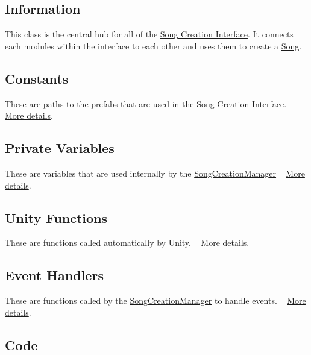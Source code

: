 \hypertarget{group___doc_s_c_m_DocSCMInfo}{}\subsection{Information}\label{group___doc_s_c_m_DocSCMInfo}
This class is the central hub for all of the \hyperlink{group___doc_s_c}{Song Creation Interface}. It connects each modules within the interface to each other and uses them to create a \hyperlink{class_song}{Song}.\hypertarget{group___doc_s_c_m_DocSCMConst}{}\subsection{Constants}\label{group___doc_s_c_m_DocSCMConst}
These are paths to the prefabs that are used in the \hyperlink{group___doc_s_c}{Song Creation Interface}. ~\newline
 \hyperlink{group___s_c_m_const}{More details}.\hypertarget{group___doc_s_c_m_DocSCMPrivVar}{}\subsection{Private Variables}\label{group___doc_s_c_m_DocSCMPrivVar}
These are variables that are used internally by the \hyperlink{class_song_creation_manager}{Song\+Creation\+Manager} ~\newline
 \hyperlink{group___s_c_m_priv_var}{More details}.\hypertarget{group___doc_s_c_m_DocSCMUnity}{}\subsection{Unity Functions}\label{group___doc_s_c_m_DocSCMUnity}
These are functions called automatically by Unity. ~\newline
 \hyperlink{group___s_c_m_unity}{More details}.\hypertarget{group___doc_s_c_m_DocSCMHandlers}{}\subsection{Event Handlers}\label{group___doc_s_c_m_DocSCMHandlers}
These are functions called by the \hyperlink{class_song_creation_manager}{Song\+Creation\+Manager} to handle events. ~\newline
 \hyperlink{group___s_c_m_handlers}{More details}.\hypertarget{group___doc_s_c_m_DocSCMCode}{}\subsection{Code}\label{group___doc_s_c_m_DocSCMCode}

